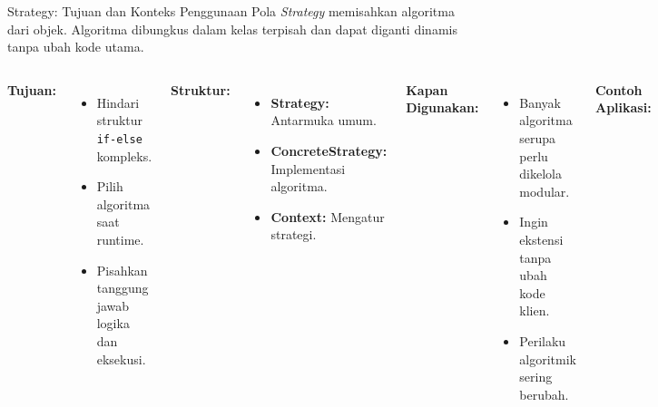 \documentclass[aspectratio=169, table]{beamer}
\begin{document}
\begin{frame}{Strategy: Tujuan dan Konteks Penggunaan}
	\vspace{20pt}
	Pola \textit{Strategy} memisahkan algoritma dari objek. Algoritma dibungkus dalam kelas terpisah dan dapat diganti dinamis tanpa ubah kode utama. 
	\vspace{1pt}
	\begin{columns}[T]
		\textbf{Tujuan:}
		\begin{itemize}
			\item Hindari struktur \texttt{if-else} kompleks.
			\item Pilih algoritma saat runtime.
			\item Pisahkan tanggung jawab logika dan eksekusi.
		\end{itemize}
		
		\textbf{Struktur:}
		\begin{itemize}
			\item \textbf{Strategy:} Antarmuka umum.
			\item \textbf{ConcreteStrategy:} Implementasi algoritma.
			\item \textbf{Context:} Mengatur strategi.
		\end{itemize}
		
		\textbf{Kapan Digunakan:}
		\begin{itemize}
			\item Banyak algoritma serupa perlu dikelola modular.
			\item Ingin ekstensi tanpa ubah kode klien.
			\item Perilaku algoritmik sering berubah.
		\end{itemize}
		
		\textbf{Contoh Aplikasi:}
		\begin{itemize}
			\item Metode pembayaran (e-wallet, kartu).
			\item Kompresi file (zip, rar, 7z).
			\item Biaya pengiriman (berat, jarak, layanan).
		\end{itemize}
	\end{columns}

\end{frame}
\end{document}
